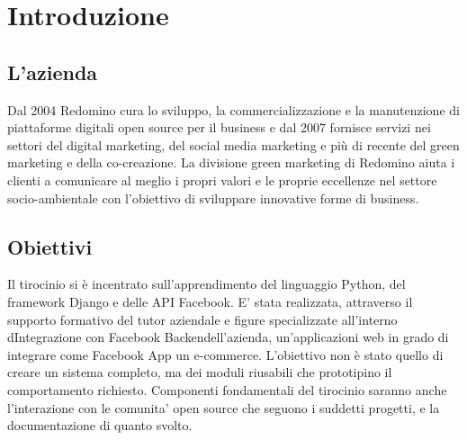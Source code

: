 \chapter{Introduzione}

\section{L'azienda}
Dal 2004 Redomino cura lo sviluppo, la commercializzazione e la manutenzione di piattaforme digitali open source per il business e dal 2007 fornisce servizi nei settori del digital marketing, del social media marketing e più di recente del green marketing e della co-creazione. La divisione green marketing di Redomino aiuta i clienti a comunicare al meglio i propri valori e le proprie eccellenze nel settore socio-ambientale con l'obiettivo di sviluppare innovative forme di business.

\section{Obiettivi}
Il tirocinio si è incentrato sull'apprendimento del linguaggio Python, del framework Django e delle API Facebook. 
E' stata realizzata, attraverso il supporto formativo del tutor aziendale e figure specializzate all'interno dIntegrazione con Facebook Backendell'azienda, un'applicazioni web in grado di integrare come Facebook App un e-commerce. 
L'obiettivo non è stato quello di creare un sistema completo, ma dei moduli riusabili che prototipino il comportamento richiesto. 
Componenti fondamentali del tirocinio saranno anche l'interazione con le comunita' open source che seguono i suddetti progetti, e la documentazione di quanto svolto.

